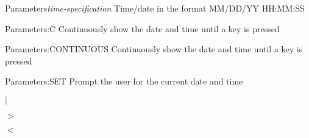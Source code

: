 \documentclass[11pt]{book}
\def\lthtmlcheckvsize{\ifdim\ht\sizebox<\vsize 
  \ifdim\wd\sizebox<\hsize\expandafter\hfill\fi \expandafter\vfill
  \else\expandafter\vss\fi}%
\begin{document}
{\newpage\clearpage
{}%
\begin{labeledpar}{Parameters}{\textit{time-specification}}
  Time/date in the format MM/DD/YY HH:MM:SS
\end{labeledpar}%
\lthtmlfigureZ
\lthtmlcheckvsize\clearpage}

{\newpage\clearpage
{}%
\begin{labeledpar}{Parameters:}{C}
  Continuously show the date and time until a key is pressed
\end{labeledpar}%
\lthtmlfigureZ
\lthtmlcheckvsize\clearpage}

{\newpage\clearpage
{}%
\begin{labeledpar}{Parameters:}{CONTINUOUS}
  Continuously show the date and time until a key is pressed
\end{labeledpar}%
\lthtmlfigureZ
\lthtmlcheckvsize\clearpage}

{\newpage\clearpage
{}%
\begin{labeledpar}{Parameters:}{SET}
  Prompt the user for the current date and time
\end{labeledpar}%
\lthtmlfigureZ
\lthtmlcheckvsize\clearpage}

{\newpage\clearpage
{}%
\(|\)%
\lthtmlindisplaymathZ
\lthtmlcheckvsize\clearpage}

{\newpage\clearpage
{}%
\(>\)%
\lthtmlindisplaymathZ
\lthtmlcheckvsize\clearpage}

{\newpage\clearpage
{}%
\(<\)%
\lthtmlindisplaymathZ
\lthtmlcheckvsize\clearpage}

{\newpage\clearpage
{}%
\begin{table}\centering
  
\end{table}%
\lthtmlfigureZ
\lthtmlcheckvsize\clearpage}

{\newpage\clearpage
{}%
\begin{table}\centering
  
\end{table}%
\lthtmlfigureZ
\lthtmlcheckvsize\clearpage}

{\newpage\clearpage
{}%
\begin{table}\centering
  
\end{table}%
\lthtmlfigureZ
\lthtmlcheckvsize\clearpage}
\end{document}
